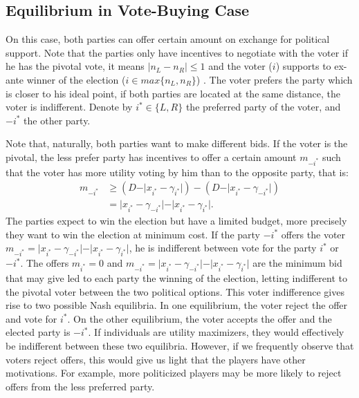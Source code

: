\documentclass[onesided]{article}\usepackage[]{graphicx}\usepackage[]{color}
\begin{document}
\subsection{Equilibrium in Vote-Buying Case}
 On this case, both parties can offer certain amount on exchange for political support. Note that the parties only have incentives to negotiate with the voter if he has the pivotal vote, it means $ \vert n_L -n_R \vert \leq 1 $ and the voter ($i$) supports to ex-ante winner of the election ($i\in max\{n_L,n_R\}$) . The voter prefers the party which is closer to his ideal point, if both parties are located at the same distance, the voter is indifferent. Denote by $i^*\in \{L,R\}$ the preferred party of the voter, and $-i^*$ the other party. 
 
 Note that, naturally, both parties want to make different bids. If the voter is the pivotal, the less prefer party has incentives to offer a certain amount $m_{-i^*}$ such that the voter has more utility voting by him than to the opposite party, that is:
\begin{align*}
    m_{-i^*} &\geq \left( D-\vert x_{i^*}-\gamma_{i^*} \vert \right) - \left( D-\vert x_{i^*}-\gamma_{-i^*} \vert \right)\\
     &=\vert x_{i^*}-\gamma_{-i^*} \vert- \vert x_{i^*}-\gamma_{i^*} \vert . 
\end{align*}
   The parties expect to win the election but have a limited budget, more precisely they want to win the election at minimum cost. If the party $-i^*$ offers  the voter $m_{-i^*}=\vert x_{i^*}-\gamma_{-i^*} \vert- \vert x_{i^*}-\gamma_{i^*} \vert$, he is indifferent between vote for the party $i^*$ or $-i^*$. The offers $m_{i^*}=0$ and $m_{-i^*}=\vert x_{i^*}-\gamma_{-i^*} \vert- \vert x_{i^*}-\gamma_{i^*} \vert$ are the minimum bid that may give led to each party the winning of the election, letting indifferent to the pivotal voter between the two political options. This voter indifference gives rise to two possible Nash equilibria.
    In one equilibrium, the voter reject the offer and vote for $i^*$. On the other equilibrium, the voter accepts the offer and the elected party is $-i^*$. If individuals are utility maximizers, they would effectively be indifferent between these two equilibria. However, if we frequently observe that voters reject offers, this would give us light that the players have other motivations. For example, more politicized players may be more likely to reject offers from the less preferred party.
  
\end{document}
